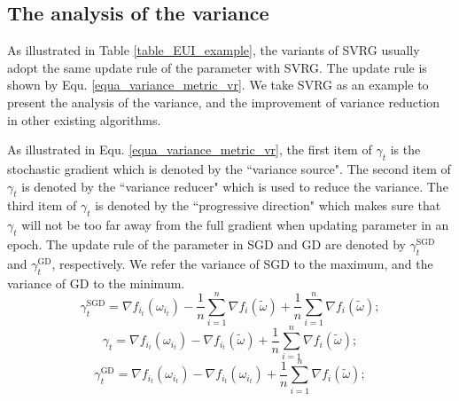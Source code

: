 \documentclass[letterpaper]{article}
\begin{document}
\subsection{The analysis of the variance}
\label{subsect_variance_analysis}
As illustrated  in Table \ref{table_EUI_example},  the variants of SVRG  usually adopt the same update rule of the parameter with SVRG. The update rule is shown by Equ. \ref{equa_variance_metric_vr}. We take SVRG  as an example to present the analysis of the variance, and the improvement of variance reduction in other existing algorithms.

As illustrated in Equ. \ref{equa_variance_metric_vr}, the first item of $\gamma_t$ is the stochastic gradient which is denoted by the ``variance source". The second item of $\gamma_t$ is denoted by the ``variance reducer" which is used to reduce the variance. The third item of $\gamma_t$ is denoted by the ``progressive direction" which makes sure that $\gamma_t$ will not be too far away from the full gradient when updating parameter in an epoch. The update rule of the parameter in SGD and GD are denoted by $\gamma_t^{\text{SGD}}$ and $\label{equa_variance_metric_gd}
\gamma_t^{\text{GD}}$, respectively.  We refer the variance of SGD to the maximum, and  the variance of GD to the minimum. 
\begin{equation}
\label{equa_variance_metric_sgd}
 \gamma_t^{\text{SGD}}=\nabla f_{i_t}(\omega_{i_t})-\frac{1}{n}\sum\limits_{i=1}^n\nabla f_i(\tilde{\omega})+\frac{1}{n}\sum\limits_{i=1}^n\nabla f_i(\tilde{\omega});
\end{equation}
\begin{equation}
\label{equa_variance_metric_vr}
\gamma_t=\nabla f_{i_t}(\omega_{i_t})-\nabla f_{i_t}(\tilde{\omega})+\frac{1}{n}\sum\limits_{i=1}^n\nabla f_i(\tilde{\omega});
\end{equation}
\begin{equation}
\label{equa_variance_metric_gd}
\gamma_t^{\text{GD}}=\nabla f_{i_t}(\omega_{i_t})-\nabla f_{i_t}(\omega_{i_t})+\frac{1}{n}\sum\limits_{i=1}^n\nabla f_i(\tilde{\omega});
\end{equation}
\end{document}
